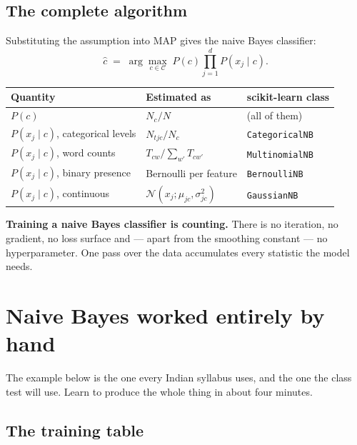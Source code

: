 \documentclass[11pt]{article}
\begin{document}
\subsection{The complete algorithm}

Substituting the assumption into MAP gives the naive Bayes classifier:
\[
  \hat{c} \;=\; \arg\max_{c \in \mathcal{C}} \;
    P(c) \prod_{j=1}^{d} P(x_j \mid c).
\]

\begin{center}\small
\begin{tabular}{@{}lll@{}}
\toprule
\textbf{Quantity} & \textbf{Estimated as} & \textbf{scikit-learn class}\\
\midrule
$P(c)$ & $N_c / N$ & (all of them)\\
$P(x_j \mid c)$, categorical levels & $N_{tjc} / N_c$ &
  \texttt{CategoricalNB}\\
$P(x_j \mid c)$, word counts & $T_{cw} / \sum_{w'} T_{cw'}$ &
  \texttt{MultinomialNB}\\
$P(x_j \mid c)$, binary presence & Bernoulli per feature &
  \texttt{BernoulliNB}\\
$P(x_j \mid c)$, continuous & $\mathcal{N}(x_j; \mu_{jc}, \sigma^2_{jc})$ &
  \texttt{GaussianNB}\\
\bottomrule
\end{tabular}
\end{center}

\begin{keyidea}
\textbf{Training a naive Bayes classifier is counting.} There is no
iteration, no gradient, no loss surface and --- apart from the smoothing
constant --- no hyperparameter. One pass over the data accumulates every
statistic the model needs.
\end{keyidea}

\section{Naive Bayes worked entirely by hand}
\label{sec:hand}

The example below is the one every Indian syllabus uses, and the one the
class test will use. Learn to produce the whole thing in about four minutes.

\subsection{The training table}
\end{document}

